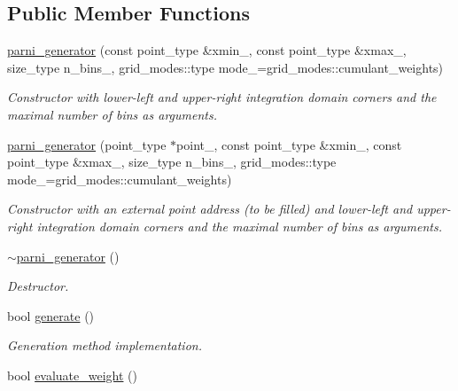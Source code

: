 \subsection*{Public Member Functions}
\begin{DoxyCompactItemize}
\item 
\hyperlink{a00394_acda2cc3d9d1d7ea5d8d5f4716e425d16}{parni\+\_\+generator} (const point\+\_\+type \&xmin\+\_\+, const point\+\_\+type \&xmax\+\_\+, size\+\_\+type n\+\_\+bins\+\_, grid\+\_\+modes\+::type mode\+\_\+=grid\+\_\+modes\+::cumulant\+\_\+weights)
\begin{DoxyCompactList}\small\item\em Constructor with lower-\/left and upper-\/right integration domain corners and the maximal number of bins as arguments. \end{DoxyCompactList}\item 
\hyperlink{a00394_a5384f89b199d41078894932608aa4167}{parni\+\_\+generator} (point\+\_\+type $\ast$point\+\_\+, const point\+\_\+type \&xmin\+\_\+, const point\+\_\+type \&xmax\+\_\+, size\+\_\+type n\+\_\+bins\+\_, grid\+\_\+modes\+::type mode\+\_\+=grid\+\_\+modes\+::cumulant\+\_\+weights)
\begin{DoxyCompactList}\small\item\em Constructor with an external point address (to be filled) and lower-\/left and upper-\/right integration domain corners and the maximal number of bins as arguments. \end{DoxyCompactList}\item 
\hypertarget{a00394_ad46e93e63d228a0d4dc0ce0f3557766b}{}\hyperlink{a00394_ad46e93e63d228a0d4dc0ce0f3557766b}{$\sim$parni\+\_\+generator} ()\label{a00394_ad46e93e63d228a0d4dc0ce0f3557766b}

\begin{DoxyCompactList}\small\item\em Destructor. \end{DoxyCompactList}\item 
\hypertarget{a00394_a7d8115145c8a1d2bc2c4ca482025c8dd}{}bool \hyperlink{a00394_a7d8115145c8a1d2bc2c4ca482025c8dd}{generate} ()\label{a00394_a7d8115145c8a1d2bc2c4ca482025c8dd}

\begin{DoxyCompactList}\small\item\em Generation method implementation. \end{DoxyCompactList}\item 
\hypertarget{a00394_a1fb09f5a92f9ba658997d8ea5911c140}{}bool \hyperlink{a00394_a1fb09f5a92f9ba658997d8ea5911c140}{evaluate\+\_\+weight} ()\label{a00394_a1fb09f5a92f9ba658997d8ea5911c140}


\end{DoxyCompactItemize}
